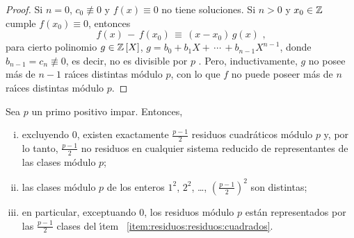 \begin{proof}
	Si $n=0$, $c_0\not\equiv 0$ y $f(x)\equiv 0$ no tiene soluciones.
	Si $n>0$ y $x_0\in\mathbb{Z}$ cumple $f(x_0)\equiv 0$, entonces
	\begin{displaymath}
		f(x)\,-\,f(x_0)\,\equiv\,(x-x_0)\,g(x)
		\text{ ,}
	\end{displaymath}
	para cierto polinomio $g\in{\ensuremath{\mathbb{Z}}}\left[X\right]$,
	$g=b_0+b_1X+\,\cdots\,+b_{n-1}X^{n-1}$, donde
	$b_{n-1}=c_n\not\equiv 0$, es decir, no es divisible por $p$
	\quedacomoejercicio.%
	Pero, inductivamente, $g$ no posee m\'as de $n-1$ ra\'{\i}ces
	distintas m\'odulo $p$, con lo que $f$ no puede poseer m\'as de
	$n$ ra\'{\i}ces distintas m\'odulo $p$.
\end{proof}

\begin{lemaResiduos}\label{lema:residuos:residuos}
	Sea $p$ un primo positivo impar. Entonces,
	\begin{enumerate}[(i)]
		\item\label{item:residuos:residuos:cantidad}
			excluyendo $0$, existen exactamente $\frac{p-1} 2$
			residuos cuadr\'aticos m\'odulo $p$ y, por lo tanto,
			$\frac{p-1} 2$ no residuos en cualquier sistema
			reducido de representantes de las clases m\'odulo $p$;
		\item\label{item:residuos:residuos:cuadrados}
			las clases m\'odulo $p$ de los enteros $1^2$, $2^2$,
			\dots, $(\tfrac{p-1} 2)^2$ son distintas;
		\item\label{item:residuos:residuos:representantes}
			en particular, exceptuando $0$, los residuos
			m\'odulo $p$ est\'an representados por las
			$\frac{p-1} 2$ clases del \'{\i}tem~%
			\eqref{item:residuos:residuos:cuadrados}.
	\end{enumerate}
\end{lemaResiduos}

